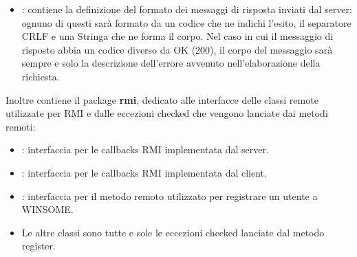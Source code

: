 \documentclass[11pt, italian, openany]{book}
\begin{document}
\begin{sloppypar}
\begin{itemize}[itemsep=0pt, parsep=0pt, topsep=0pt]
\begin{itemize}
\begin{itemize}
\begin{itemize}
				Nel secondo caso, a ogni dato il mittente avr\`a anteposto la lunghezza del vettore di bytes ricavato dalla sua
				codifica: si usa questa informazione per determinare inequivocabilmente i confini di ciascuno.
				\item Il messaggio proviene dal client: il messaggio sar\`a formato da un solo dato JSON.
			\end{itemize}
			\item Il messaggio non contiene una entit\`a: in questo caso, si legge la stringa ricevuta.
		\end{itemize}
	\end{itemize}
	Ovviamente, per entrambi (sia mittente sia destinatario) risulta necessario conoscere il formato del dato JSON ricevuto.
	\item {}: contiene la definizione del formato dei messaggi di risposta inviati dal server: ognuno di questi
	sar\`a formato da un codice che ne indichi l'esito, il separatore CRLF e una Stringa che ne forma il corpo. Nel caso in cui
	il messaggio di risposto abbia un codice diverso da OK (200), il corpo del messaggio sar\`a sempre e solo la descrizione
	dell'errore avvenuto nell'elaborazione della richiesta.
\end{itemize}
Inoltre contiene il package \textbf{rmi}, dedicato alle interfacce delle classi remote utilizzate per RMI e dalle eccezioni checked
che vengono lanciate dai metodi remoti:
\begin{itemize}[itemsep=0pt, parsep=0pt, topsep=0pt]
	\item {}: interfaccia per le callbacks RMI implementata dal server.
	\item {}: interfaccia per le callbacks RMI implementata dal client.
	\item {}: interfaccia per il metodo remoto  utilizzato per registrare un utente a WINSOME.
	\item Le altre classi sono tutte e sole le eccezioni checked lanciate dal metodo register.
\end{itemize}


\end{sloppypar}
\end{document}
